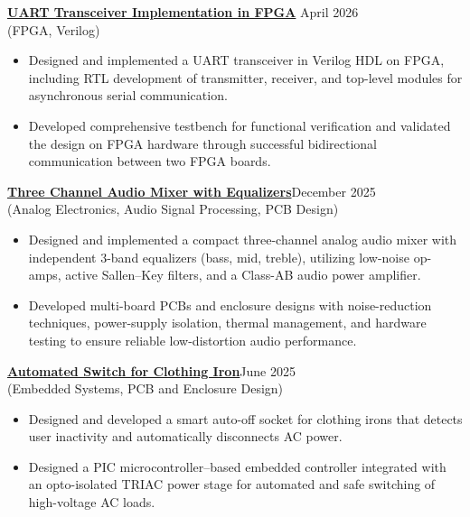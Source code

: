 \documentclass[10pt,a4paper]{article}
\begin{document}
\vspace{0.3cm}

\href{https://github.com/TharushaNimesh22/UART-Transceiver-Implementation-in-FPGA}{\textbf{UART Transceiver Implementation in FPGA}}
\hfill April 2026 \\
(FPGA, Verilog)

\begin{itemize}
    \item Designed and implemented a UART transceiver in Verilog HDL on FPGA, including RTL development of transmitter, receiver, and top-level modules for asynchronous serial communication.

    \item Developed comprehensive testbench for functional verification and validated the design on FPGA hardware through successful bidirectional communication between two FPGA boards.
\end{itemize}






\vspace{0.3cm}

\href{https://github.com/TharushaNimesh22/Three-Channel-Audio-Mixer-with-Equalizers}{\textbf{Three Channel Audio Mixer with Equalizers}}\hfill December 2025\\
(Analog Electronics, Audio Signal Processing, PCB Design)

\begin{itemize}
    \item Designed and implemented a compact three-channel analog audio mixer with independent 3-band equalizers (bass, mid, treble), utilizing low-noise op-amps, active Sallen–Key filters, and a Class-AB audio power amplifier.
    \item Developed multi-board PCBs and enclosure designs with noise-reduction techniques, power-supply isolation, thermal management, and hardware testing to ensure reliable low-distortion audio performance.
\end{itemize}



\vspace{0.3cm}

\newpage

\href{https://github.com/TharushaNimesh22/Automated-Switch-for-Clothing-Iron}{\textbf{Automated Switch for Clothing Iron}}\hfill June 2025\\
(Embedded Systems, PCB and Enclosure Design)

\begin{itemize}
    \item Designed and developed a smart auto-off socket for clothing irons that detects user inactivity and automatically disconnects AC power.

    \item Designed a PIC microcontroller–based embedded controller integrated with an opto-isolated TRIAC power stage for automated and safe switching of high-voltage AC loads.
\end{itemize}
\vspace{0.3cm}
\end{document}
